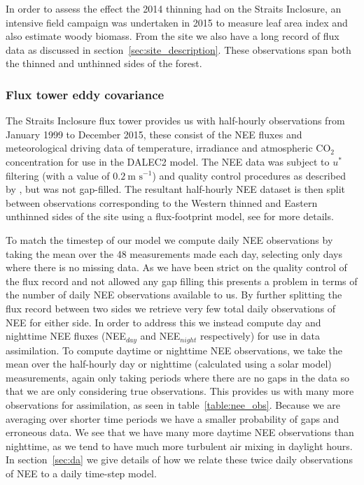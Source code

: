 \documentclass[draft,linenumbers]{agujournal}
\begin{document}
In order to assess the effect the 2014 thinning had on the Straits Inclosure, an intensive field campaign was undertaken in 2015 to measure leaf area index and also estimate woody biomass. From the site we also have a long record of flux data as discussed in section~\ref{sec:site_description}. These observations span both the thinned and unthinned sides of the forest.

\subsubsection{Flux tower eddy covariance} \label{sec:eddycov} 

The Straits Inclosure flux tower provides us with half-hourly observations from January 1999 to December 2015, these consist of the NEE fluxes and meteorological driving data of temperature, irradiance and atmospheric CO\(_{2}\) concentration for use in the DALEC2 model. The NEE data was subject to \(u^*\) filtering (with a value of \(0.2~\text{m s}^{-1}\)) and quality control procedures as described by \citet{papale2006towards}, but was not gap-filled. The resultant half-hourly NEE dataset is then split between observations corresponding to the Western thinned and Eastern unthinned sides of the site using a flux-footprint model, see \citet{wilkinson2015effects} for more details.  

To match the timestep of our model we compute daily NEE observations by taking the mean over the 48 measurements made each day, selecting only days where there is no missing data. As we have been strict on the quality control of the flux record and not allowed any gap filling this presents a problem in terms of the number of daily NEE observations available to us. By further splitting the flux record between two sides we retrieve very few total daily observations of NEE for either side. In order to address this we instead compute day and nighttime NEE fluxes (NEE\(_{day}\) and NEE\(_{night}\) respectively) for use in data assimilation. To compute daytime or nighttime NEE observations, we take the mean over the half-hourly day or nighttime (calculated using a solar model) measurements, again only taking periods where there are no gaps in the data so that we are only considering true observations. This provides us with many more observations for assimilation, as seen in table~\ref{table:nee_obs}. Because we are averaging over shorter time periods we have a smaller probability of gaps and erroneous data. We see that we have many more daytime NEE observations than nighttime, as we tend to have much more turbulent air mixing in daylight hours. In section~\ref{sec:da} we give details of how we relate these twice daily observations of NEE to a daily time-step model.     
\end{document}

